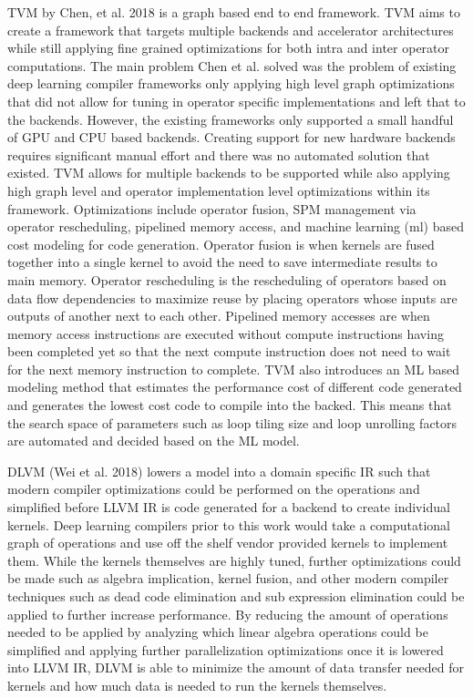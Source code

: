 TVM by Chen, et al. 2018 is a graph based end to end framework. 
TVM aims to create a framework that targets
multiple backends and accelerator architectures while still applying
fine grained optimizations for both intra and inter operator computations.
The main problem Chen et al. solved was the problem of existing deep learning
compiler frameworks only applying high level graph optimizations that did
not allow for tuning in operator specific implementations and left that to
the backends. However, the existing frameworks only supported a small handful
of GPU and CPU based backends. Creating support for new hardware backends
requires significant manual effort and there was no automated solution that 
existed. TVM allows for multiple backends to be supported while also
applying high graph level and operator implementation level optimizations
within its framework. Optimizations include operator fusion, SPM management via
operator rescheduling, pipelined memory access, and machine learning (ml) based
cost modeling for code generation. Operator fusion is when kernels are fused
together into a single kernel to avoid the need to save intermediate results
to main memory. Operator rescheduling is the rescheduling of operators based
on data flow dependencies to maximize reuse by placing operators whose
inputs are outputs of another next to each other. Pipelined memory accesses are
when memory access instructions are executed without compute instructions having
been completed yet so that the next compute instruction does not need to wait
for the next memory instruction to complete. TVM also introduces an ML
based modeling method that estimates the performance cost of different
code generated and generates the lowest cost code to compile into the backed.
This means that the search space of parameters such as loop tiling size and 
loop unrolling factors are automated and decided based on the ML model.

DLVM \cite{dlvm} (Wei et al. 2018) lowers a model into a domain specific IR
such that modern compiler optimizations could be performed on the operations
and simplified before LLVM IR is code generated for a backend to create
individual kernels. Deep learning compilers \cite{tensorflow} \cite{torch}
prior to this work would take a computational graph of operations and use off
the shelf vendor provided kernels to implement them. While the kernels
themselves are highly tuned, further optimizations could be made such as
algebra implication, kernel fusion, and other modern compiler techniques such
as dead code elimination and sub expression elimination could be applied to
further increase performance. By reducing the amount of operations needed to be
applied by analyzing which linear algebra operations could be simplified and
applying further parallelization optimizations once it is lowered into LLVM IR,
DLVM is able to minimize the amount of data transfer needed for kernels and how
much data is needed to run the kernels themselves.

